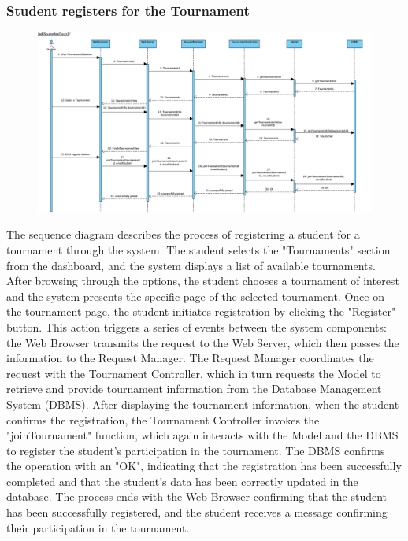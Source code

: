 \subsubsection{Student registers for the Tournament}
\begin{figure}[H]
    \centering
    \includegraphics[width=1\textwidth]{SequenceDiagram/StudenRegTourn.png}
    \label{fig:enter-label}
\end{figure}
The sequence diagram describes the process of registering a student for a tournament through the  system. The student selects the "Tournaments" section from the dashboard, and the system displays a list of available tournaments. After browsing through the options, the student chooses a tournament of interest and the system presents the specific page of the selected tournament.
Once on the tournament page, the student initiates registration by clicking the "Register" button. This action triggers a series of events between the system components: the Web Browser transmits the request to the Web Server, which then passes the information to the Request Manager. The Request Manager coordinates the request with the Tournament Controller, which in turn requests the Model to retrieve and provide tournament information from the Database Management System (DBMS).
After displaying the tournament information, when the student confirms the registration, the Tournament Controller invokes the "joinTournament" function, which again interacts with the Model and the DBMS to register the student's participation in the tournament. The DBMS confirms the operation with an "OK", indicating that the registration has been successfully completed and that the student's data has been correctly updated in the database.
The process ends with the Web Browser confirming that the student has been successfully registered, and the student receives a message confirming their participation in the tournament.


